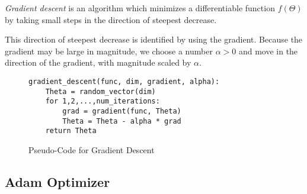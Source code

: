 \begin{definition}
  \label{def:gradient-descent}
  \emph{Gradient descent} is an algorithm which minimizes a differentiable function $f(\Theta)$ by taking small steps in the direction of steepest decrease.

  This direction of steepest decrease is identified by using the gradient. Because the gradient may be large in magnitude, we choose a number $\alpha > 0$ and move in the direction of the gradient, with magnitude scaled by $\alpha$.
\end{definition}

\begin{figure}[H]
\begin{verbatim}
gradient_descent(func, dim, gradient, alpha):
    Theta = random_vector(dim)
    for 1,2,...,num_iterations:
        grad = gradient(func, Theta)
        Theta = Theta - alpha * grad
    return Theta
\end{verbatim}
\caption{Pseudo-Code for Gradient Descent}
\end{figure}

\subsection{Adam Optimizer}
\label{sec:adam-optim}



